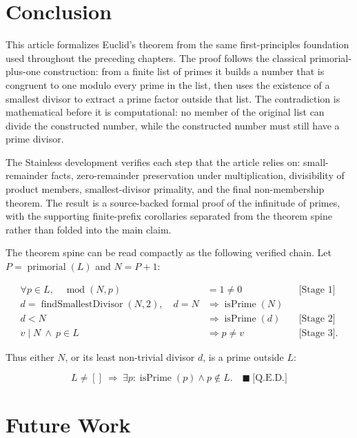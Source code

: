 \section{Conclusion}
\label{sec:conclusion}

This article formalizes Euclid's theorem from the same first-principles
foundation used throughout the preceding chapters. The proof follows the
classical primorial-plus-one construction: from a finite list of primes it
builds a number that is congruent to one modulo every prime in the list,
then uses the existence of a smallest divisor to extract a prime factor
outside that list. The contradiction is mathematical before it is
computational: no member of the original list can divide the constructed
number, while the constructed number must still have a prime divisor.

The Stainless development verifies each step that the article relies on:
small-remainder facts, zero-remainder preservation under multiplication,
divisibility of product members, smallest-divisor primality, and the
final non-membership theorem. The result is a source-backed formal proof
of the infinitude of primes, with the supporting finite-prefix corollaries
separated from the theorem spine rather than folded into the main claim.

The theorem spine can be read compactly as the following verified chain.
Let $P=\operatorname{primorial}(L)$ and $N=P+1$:

\begin{equation*}
\begin{aligned}
\forall p\in L,\quad \operatorname{mod}(N,p)&=1\ne0
&&\text{[Stage 1]} \\
d=\operatorname{findSmallestDivisor}(N,2),\quad d=N
&\Rightarrow \operatorname{isPrime}(N) \\
d<N
&\Rightarrow \operatorname{isPrime}(d)
&&\text{[Stage 2]} \\
v\mid N\ \land\ p\in L
&\Rightarrow p\ne v
&&\text{[Stage 3].}
\end{aligned}
\end{equation*}

Thus either $N$, or its least non-trivial divisor $d$, is a prime outside
$L$:

\begin{equation*}
L\ne[]\ \Rightarrow\ \exists p:\operatorname{isPrime}(p)\land p\notin L.
\quad\blacksquare\ \text{[Q.E.D.]}
\end{equation*}

\section{Future Work}
\label{sec:future-work}

